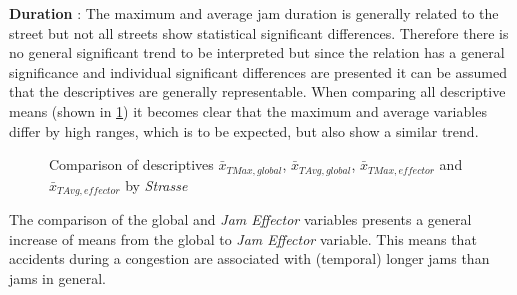 \textbf{Duration} : The maximum and average jam duration is generally related to the street but not all streets show statistical significant differences. Therefore there is no general significant trend to be interpreted but since the relation has a general significance and individual significant differences are presented it can be assumed that the descriptives are generally representable. When comparing all descriptive means (shown in \cref{fig:baysis_summary_Str_duration_barplot}) it becomes clear that the maximum and average variables differ by high ranges, which is to be expected, but also show a similar trend.
\begin{figure}[ht!]
    \data
    \pgfplotstablesort[sort key=means, sort cmp=float >]{\datasorted}{\data}
    \tiny
    \centering
    \caption{Comparison of descriptives $\bar{x}_{TMax,global}$, $\bar{x}_{TAvg,global}$, $\bar{x}_{TMax,effector}$ and $\bar{x}_{TAvg,effector}$ by \textit{Strasse}}
    \label{fig:baysis_summary_Str_duration_barplot}
\end{figure}
The comparison of the global and \textit{Jam Effector} variables presents a general increase of means from the global to \textit{Jam Effector} variable. This means that accidents during a congestion are associated with (temporal) longer jams than jams in general.

